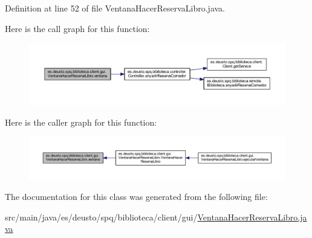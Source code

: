 Definition at line 52 of file Ventana\+Hacer\+Reserva\+Libro.\+java.

Here is the call graph for this function\+:
\nopagebreak
\begin{figure}[H]
\begin{center}
\leavevmode
\includegraphics[width=350pt]{classes_1_1deusto_1_1spq_1_1biblioteca_1_1client_1_1gui_1_1_ventana_hacer_reserva_libro_a62aec2a93b911472883ffb3bb83f3d92_cgraph}
\end{center}
\end{figure}
Here is the caller graph for this function\+:
\nopagebreak
\begin{figure}[H]
\begin{center}
\leavevmode
\includegraphics[width=350pt]{classes_1_1deusto_1_1spq_1_1biblioteca_1_1client_1_1gui_1_1_ventana_hacer_reserva_libro_a62aec2a93b911472883ffb3bb83f3d92_icgraph}
\end{center}
\end{figure}


The documentation for this class was generated from the following file\+:\begin{DoxyCompactItemize}
\item 
src/main/java/es/deusto/spq/biblioteca/client/gui/\mbox{\hyperlink{_ventana_hacer_reserva_libro_8java}{Ventana\+Hacer\+Reserva\+Libro.\+java}}\end{DoxyCompactItemize}
